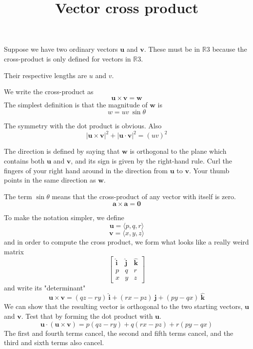 \documentclass[11pt, oneside]{article}   	%
\title{Vector cross product}
\date{}
\begin{document}
\maketitle
\Large

\label{sec:Vector_cross_product}

Suppose we have two ordinary vectors $\mathbf{u}$ and $\mathbf{v}$.  These must be in $\mathbb{R}3$ because the cross-product is only defined for vectors in $\mathbb{R}3$.

Their respective lengths are $u$ and $v$.

We write the cross-product as
\[ \mathbf{u} \times \mathbf{v} = \mathbf{w}  \]
The simplest definition is that the magnitude of $\mathbf{w}$ is 
\[ w = uv \ \sin \theta \]

The symmetry with the dot product is obvious.  Also
\[ | \mathbf{u} \times \mathbf{v} |^2 + | \mathbf{u} \cdot \mathbf{v} |^2 = (uv)^2 \]

The direction is defined by saying that $\mathbf{w}$ is orthogonal to the plane which contains both $\mathbf{u}$ and $\mathbf{v}$, and its sign is given by the right-hand rule.  Curl the fingers of your right hand around in the direction from $\mathbf{u}$ to $\mathbf{v}$.  Your thumb points in the same direction as $\mathbf{w}$.  

The term $\sin \theta$ means that the cross-product of any vector with itself is zero.
\[ \mathbf{a} \times \mathbf{a} = \mathbf{0}  \]

To make the notation simpler, we define
\[ \mathbf{u} = \langle p,q,r \rangle \]
\[ \mathbf{v} = \langle x,y,z \rangle \]
and in order to compute the cross product, we form what looks like a really weird matrix
\[
\begin{bmatrix} 
  \hat{\mathbf{i}}  & \hat{\mathbf{j}}  &  \hat{\mathbf{k}} \\ 
  p  &  q & r \\
  x  &  y & z
\end{bmatrix}
\]
and write its "determinant"
\[ \mathbf{u} \times \mathbf{v}  = (qz - ry) \ \hat{\mathbf{i}} + (rx - pz) \  \hat{\mathbf{j}}  + (py - qx) \ \hat{\mathbf{k}}  \]
We can show that the resulting vector is orthogonal to the two starting vectors, $\mathbf{u}$ and $\mathbf{v}$.  Test that by forming the dot product with $\mathbf{u}$.
\[ \mathbf{u} \cdot (\mathbf{u} \times \mathbf{v})  =  p(qz - ry) + q(rx - pz)   + r(py - qx)  \] 
The first and fourth terms cancel, the second and fifth terms cancel, and the third and sixth terms also cancel.  
\end{document}
